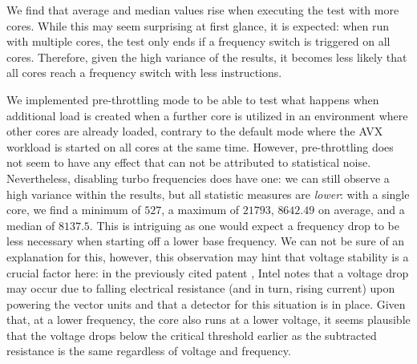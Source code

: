 We find that average and median values rise when executing the test with more cores. While this may seem surprising at first glance, it is expected: when run with multiple cores, the test only ends if a frequency switch is triggered on all cores. Therefore, given the high variance of the results, it becomes less likely that all cores reach a frequency switch with less instructions.

We implemented pre-throttling mode to be able to test what happens when additional load is created when a further core is utilized in an environment where other cores are already loaded, contrary to the default mode where the \gls{AVX} workload is started on all cores at the same time. However, pre-throttling does not seem to have any effect that can not be attributed to statistical noise. Nevertheless, disabling turbo frequencies does have one: we can still observe a high variance within the results, but all statistic measures are \emph{lower}: with a single core, we find a minimum of $527$, a maximum of $21793$, $8642.49$ on average, and a median of $8137.5$. This is intriguing as one would expect a frequency drop to be less necessary when starting off a lower base frequency. We can not be sure of an explanation for this, however, this observation may hint that voltage stability is a crucial factor here: in the previously cited patent \cite{bonen2016performing}, Intel notes that a voltage drop may occur due to falling electrical resistance (and in turn, rising current) upon powering the vector units and that a detector for this situation is in place. Given that, at a lower frequency, the core also runs at a lower voltage, it seems plausible that the voltage drops below the critical threshold earlier as the subtracted resistance is the same regardless of voltage and frequency.

